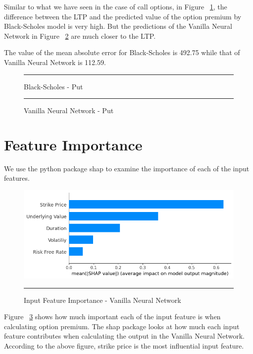 Similar to what we have seen in the case of call options, in Figure ~\ref{fig:bs_preds_put}, the difference between the LTP and the predicted value of the option premium by Black-Scholes model is very high. But the predictions of the Vanilla Neural Network in Figure ~\ref{fig:nn_preds_put} are much closer to the LTP. 

The value of the mean absolute error for Black-Scholes is 492.75 while that of Vanilla Neural Network is 112.59.

\begin{figure}[htbp]
  \centering
    
    \rule{35em}{0.5pt}
  \caption[Black-Scholes - Put]{Black-Scholes - Put}
  \label{fig:bs_preds_put}
\end{figure}

\begin{figure}[htbp]
  \centering
    
    \rule{35em}{0.5pt}
  \caption[Vanilla Neural Network - Put]{Vanilla Neural Network - Put}
  \label{fig:nn_preds_put}
\end{figure}

\section{Feature Importance}

We use the python package shap\cite{NIPS2017_7062} to examine the importance of each of the input features.

\begin{figure}[htbp]
  \centering
    \includegraphics[scale=0.55]{Figures/shap_2.png}
    \rule{35em}{0.5pt}
  \caption[Input Feature Importance - Vanilla Neural Network]{Input Feature Importance - Vanilla Neural Network}
  \label{fig:shap_1}
\end{figure}

Figure ~\ref{fig:shap_1} shows how much important each of the input feature is when calculating option premium. The shap package looks at how much each input feature contributes when calculating the output in the Vanilla Neural Network.
According to the above figure, strike price is the most influential input feature. 

